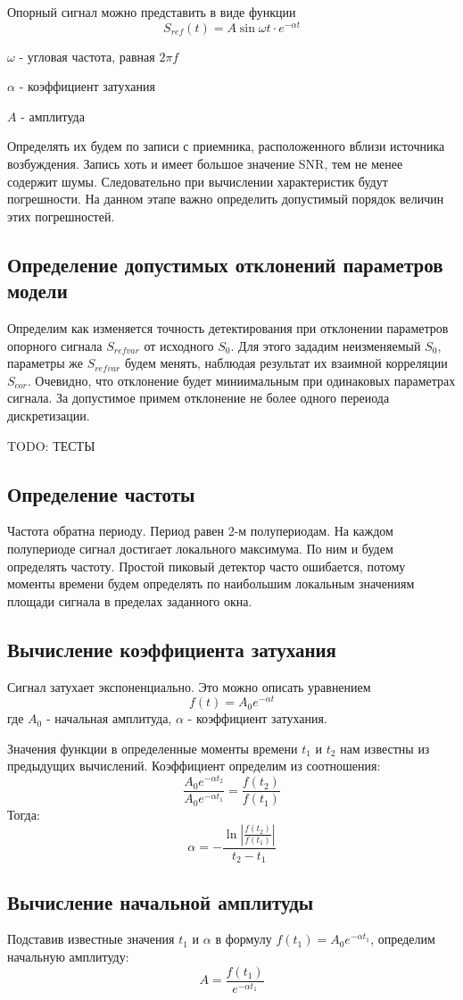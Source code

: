 \documentclass[a4paper,10pt]{article}
\begin{document}
Опорный сигнал можно представить в виде функции
\[ S_{ref}(t) = A\sin{\omega t}\cdot e^{-\alpha t} \]

$\omega$ - угловая частота, равная $2\pi f$

$\alpha$ - коэффициент затухания

$A$ - амплитуда


Определять их будем по записи с приемника, расположенного вблизи источника возбуждения. Запись хоть и имеет большое значение SNR, тем не менее содержит шумы. Следовательно при вычислении характеристик будут погрешности. На данном этапе важно определить допустимый порядок величин этих погрешностей.

\subsection{Определение допустимых отклонений параметров модели}
Определим как изменяется точность детектирования при отклонении параметров опорного сигнала $S_{refvar}$ от исходного $S_0$. Для этого зададим неизменяемый $S_0$, параметры же $S_{refvar}$ будем менять, наблюдая результат их взаимной корреляции $S_{cor}$. Очевидно, что отклонение будет миниимальным при одинаковых параметрах сигнала. За допустимое примем отклонение не более одного переиода дискретизации.

TODO: ТЕСТЫ


\subsection{Определение частоты}
Частота обратна периоду. Период равен 2-м полупериодам. На каждом полупериоде сигнал достигает локального максимума. По ним и будем определять частоту. Простой пиковый детектор часто ошибается, потому моменты времени будем определять по наибольшим локальным значениям площади сигнала в пределах заданного окна.

\subsection{Вычисление коэффициента затухания}

Сигнал затухает экспоненциально. Это можно описать уравнением
\[f(t) = A_0e^{-\alpha t}\]
где $A_0$ - начальная амплитуда,
$\alpha$ - коэффициент затухания.

Значения функции в определенные моменты времени $t_1$ и $t_2$ нам известны из предыдущих вычислений. Коэффициент определим из соотношения:
\[ \frac{A_0e^{-\alpha t_2}}{A_0e^{-\alpha t_1}} = \frac{f(t_2)}{f(t_1)} \]
Тогда:
\[ \alpha = -\frac{\ln|\frac{f(t_2)}{f(t_1)}|}{t_2 - t_1} \]

\subsection{Вычисление начальной амплитуды}

Подставив известные значения $t_1$ и $\alpha$ в формулу
$f(t_1) = A_0e^{-\alpha t_1}$, определим начальную амплитуду:
\[ A= \frac{f(t_1)}{e^{-\alpha t_1}}\]
\end{document}
